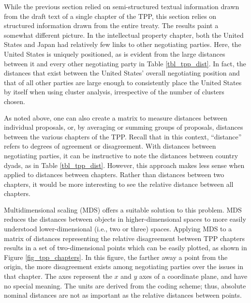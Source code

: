 \documentclass[12pt]{article}
\begin{document}
While the previous section relied on semi-structured textual information 
drawn from the draft text of a single chapter of the TPP, this section relies on structured information 
drawn from the entire treaty. The results paint a somewhat different picture. In the intellectual 
property chapter, both the United States and Japan had relatively few links to other negotiating 
parties. Here, the United States is uniquely positioned, as is evident from the large distances 
between it and every other negotiating party in Table \ref{tbl_tpp_dist}. 
In fact, the distances that exist between the United States' overall negotiating position 
and that of all other parties are large enough to consistently place the United States by itself when 
using cluster analysis, irrespective of the number of clusters chosen.

As noted above, one can also create a matrix to measure distances between 
individual proposals, or, by averaging or summing groups of proposals, distances 
between the various chapters of the TPP. Recall that in this context, ``distance'' refers to 
degrees of agreement or disagreement. With distances between negotiating parties, it can be instructive to note the distances between country dyads, as in Table \ref{tbl_tpp_dist}. 
However, this approach makes less sense when applied to distances 
between chapters. Rather than distances between two chapters, it would be more interesting to see 
the relative distance between all chapters.

Multidimensional scaling (MDS) offers a suitable solution to this problem. MDS reduces the distances 
between 
objects in higher-dimensional spaces to more easily understood lower-dimensional (i.e., two or three) 
spaces. Applying MDS to a matrix of distances representing the relative disagreement between TPP chapters results in a set of 
two-dimensional 
points which can be easily plotted, as shown in Figure \ref{fig_tpp_chapters}. In this figure, the farther away a point from the origin, the more disagreement 
exists among negotiating parties over the issues in that chapter.
The axes represent the $x$ and $y$ axes of a 
coordinate plane, and have no special meaning. The units are derived from the coding scheme; thus, 
absolute nominal distances are not as important as the relative distances between points.
\end{document}
